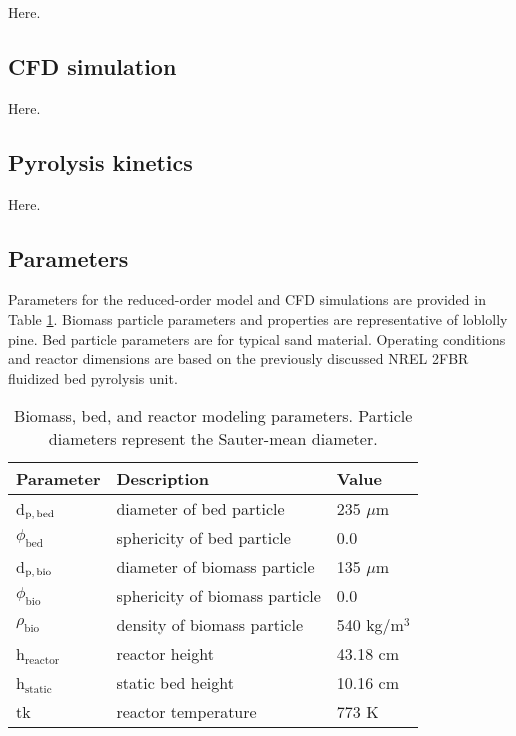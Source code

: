 Here.

\subsection{CFD simulation}

Here.

\subsection{Pyrolysis kinetics}

Here.

\subsection{Parameters}

Parameters for the reduced-order model and CFD simulations are provided in Table \ref{tab:params}. Biomass particle parameters and properties are representative of loblolly pine. Bed particle parameters are for typical sand material. Operating conditions and reactor dimensions are based on the previously discussed NREL 2FBR fluidized bed pyrolysis unit.

\begin{table}[ht]
    \centering
    \caption{Biomass, bed, and reactor modeling parameters. Particle diameters represent the Sauter-mean diameter.}
    \begin{tabular}{lll}
        \hline
        Parameter & Description & Value \\
        \hline
        d$_\textrm{p,\,bed}$    & diameter of bed particle          & 235 $\mu$m \\
        $\phi_\textrm{bed}$     & sphericity of bed particle        & 0.0 \\
        d$_\textrm{p,\,bio}$    & diameter of biomass particle      & 135 $\mu$m \\
        $\phi_\textrm{bio}$     & sphericity of biomass particle    & 0.0 \\
        $\rho_\textrm{bio}$     & density of biomass particle       & 540 kg/m$^3$ \\
        h$_\textrm{reactor}$    & reactor height                    & 43.18 cm \\
        h$_\textrm{static}$     & static bed height                 & 10.16 cm\\
        tk                      & reactor temperature               & 773 K \\
        \hline
    \end{tabular}
    \label{tab:params}
\end{table}
